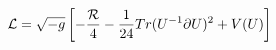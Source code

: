 \begin{equation}
{\cal L} = \sqrt{-g}\left[-{{\cal R}\over 4}
- {1\over 24} Tr (U^{-1}\partial U)^2 + V(U)
\right]\label{m32}
\end{equation}

